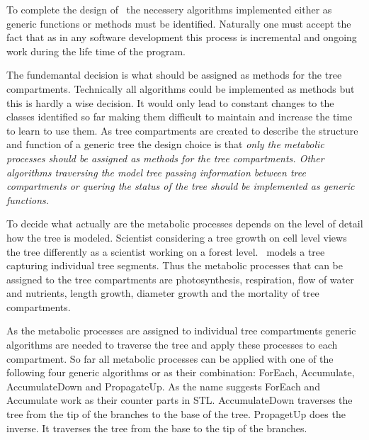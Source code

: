 To  complete the   design  of    \lignum\ the necessery     algorithms
implemented  either   as generic   functions     or methods must    be
identified. Naturally one must accept the fact that as in any software
development this  process is incremental and   ongoing work during the
life time of the program.

The fundemantal decision is what should be assigned as methods for the
tree compartments. Technically  all algorithms could be implemented as
methods but this is  hardly a wise decision.   It  would only lead  to
constant  changes  to  the  classes   identified  so far making   them
difficult to maintain and increase the time to learn  to use them.  As
tree compartments are created  to describe the structure  and function
of a  generic tree the design  choice  is that \it  only the metabolic
processes \rm should be assigned as methods for the tree compartments.
Other algorithms traversing the model tree passing information between
tree compartments or   quering  the  status  of the  tree  should   be
implemented as generic functions.

To decide what actually  are the  metabolic  processes depends  on the
level of detail how the tree is modeled.  Scientist considering a tree
growth on cell level views the tree differently as a scientist working
on a  forest level. \lignum\ models  a tree capturing  individual tree
segments.  Thus  the metabolic processes that can  be assigned  to the
tree  compartments are photosynthesis, respiration,  flow of water and
nutrients,  length growth, diameter growth  and  the mortality of tree
compartments.

As   the  metabolic  processes   are   assigned   to   individual tree
compartments  generic algorithms are  needed to traverse  the tree and
apply these processes   to each  compartment.   So far   all metabolic
processes can  be  applied with  one  of  the following   four generic
algorithms   or   as     their   combination:   ForEach,   Accumulate,
AccumulateDown  and PropagateUp.   As the  name   suggests ForEach and
Accumulate work   as  their counter  parts   in  STL.   AccumulateDown
traverses  the tree from the  tip of the branches to   the base of the
tree. PropagetUp does the inverse. It traverses the tree from the base
to the tip of the branches.

